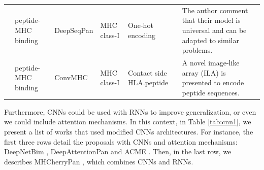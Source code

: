 \begin{table}[]
{\begin{tabular}{p{1.3cm}p{1.6cm}p{2cm}p{1.6cm}p{1.9cm}p{4cm}}
			           \cite{liu2019deepseqpan}  & peptide-MHC binding      & DeepSeqPan    & MHC class-I        & One-hot encoding                                    & The author comment that their model is universal and can be adapted to similar problems.                                  \\
			           \cite{han2018deep}        & peptide-MHC binding      & ConvMHC       & MHC class-I        & Contact side HLA.peptide                            & A novel image-like array (ILA) is presented to encode peptide sequences.                              
		\end{tabular}
	}
\end{table}



Furthermore, CNNs could be used with RNNs to improve generalization, or even we could include attention mechanisms. In this context, in Table \ref{tab:cnn1}, we present a list of works that used modified CNNs architectures. For instance, the first three rows detail the proposals with CNNs and attention mechanisms: DeepNetBim \cite{yang2021deepnetbim}, DeepAttentionPan \cite{jin2021deep} and ACME \cite{hu2019acme}. Then, in the last row, we describes MHCherryPan \cite{xie2020mhcherrypan}, which combines CNNs and RNNs.\\

